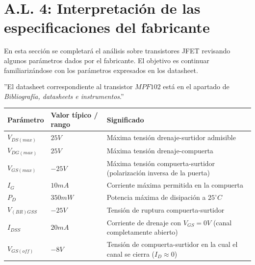 \section{A.L. 4: Interpretación de las especificaciones del fabricante}
\sangria{} En esta sección se completará el análisis sobre transistores JFET revisando algunos parámetros dados por el fabricante. El objetivo es continuar familiarizándose con los parámetros expresados en los datasheet.

''El datasheet correspondiente al transistor $MPF102$ está en el apartado de \textit{Bibliografía, datasheets e instrumentos}.''


\begin{center}
\begin{tabular}{|
>{\columncolor[HTML]{FFCCC9}}l |l|l|}
\hline
\cellcolor[HTML]{FFFFC7}\textbf{Parámetro} &
\cellcolor[HTML]{FFFFC7}\textbf{Valor típico / rango} &
\cellcolor[HTML]{FFFFC7}\textbf{Significado} \\ \hline

\textbf{$V_{DS(max)}$} & $25V$ & Máxima tensión drenaje-surtidor admisible \\ \hline

\textbf{$V_{DG(max)}$} & $25V$ & Máxima tensión drenaje-compuerta \\ \hline

\textbf{$V_{GS(max)}$} & $-25V$ & Máxima tensión compuerta-surtidor (polarización inversa de la puerta) \\ \hline

\textbf{$I_G$} & $10mA$ & Corriente máxima permitida en la compuerta \\ \hline

\textbf{$P_D$} & $350mW$ & Potencia máxima de disipación a $25^\circ C$ \\ \hline

\textbf{$V_{(BR)GSS}$} & $-25V$ & Tensión de ruptura compuerta-surtidor \\ \hline

\textbf{$I_{DSS}$} & $20mA$ & Corriente de drenaje con $V_{GS}=0V$ (canal completamente abierto) \\ \hline

\textbf{$V_{GS(off)}$} & $-8V$ & Tensión de compuerta-surtidor en la cual el canal se cierra ($I_{D}\approx 0$) \\ \hline

\end{tabular}
\end{center}
